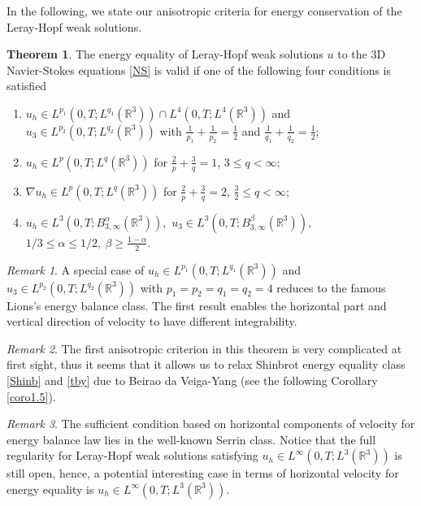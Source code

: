\documentclass[11pt]{article}
\theoremstyle{plain}\newtheorem{definition}{Definition}[section]
\theoremstyle{definition}\newtheorem{theorem}{Theorem}[section]
\theoremstyle{plain}\newtheorem{lemma}[theorem]{Lemma}
\theoremstyle{plain}\newtheorem{coro}[theorem]{Corollary}
\theoremstyle{plain}\newtheorem{prop}[theorem]{Proposition}
\theoremstyle{remark}\newtheorem{remark}{Remark}[section]
\newcommand{\f}{\frac}
\numberwithin{equation}{section}
\begin{document}
In the following, we state our anisotropic criteria for energy conservation of the Leray-Hopf weak solutions.
   \begin{theorem}\label{the1.4}
The energy equality of Leray-Hopf weak solutions $u$ to the 3D Navier-Stokes equations \eqref{NS} is valid if one of the following four conditions is satisfied
 \begin{enumerate}[(1)]
 \item  $u_{h}\in L^{p_{1}}(0,T;L^{q_{1}}(\mathbb{R}^{3}))\cap L^{4}(0,T;L^{4}(\mathbb{R}^{3}))$       and  $u_{3}\in L^{p_{2}}(0,T;L^{q_{2}}(\mathbb{R}^{3}))$  with
$\f{1}{p_{1}}+\f{1}{p_{2}}=\f12$  and  $\f{1}{q_{1}}+\f{1}{q_{2}}=\f12$;
 \item $u_{h}\in L^{p }(0,T;L^{q }(\mathbb{R}^{3}))$ for $\f{2}{p }+\f{3}{q }=1$, $3\leq q < \infty;$
     \item $\nabla u_{h}\in L^{p }(0,T;L^{q }(\mathbb{R}^{3}))$ for $\f{2}{p }+\f{3}{q }=2$, $\f32\leq q <\infty;$
     \item
     $u_{h}\in L^{3}(0,T;B^{\alpha}_{3,\infty}(\mathbb{R}^{3})),$ $u_{3}\in L^{3}(0,T;B^{\beta}_{3,\infty}(\mathbb{R}^{3})),$ $1/3\leq\alpha\leq 1/2,\  \beta\geq \frac{1-\alpha}{2}.$
\end{enumerate}
 \end{theorem}


 \begin{remark}
 A special case of   $u_{h}\in L^{p_{1}}(0,T;L^{q_{1}}(\mathbb{R}^{3}))$       and  $u_{3}\in L^{p_{2}}(0,T;L^{q_{2}}(\mathbb{R}^{3}))$ with  $p_{1}=p_{2}=q_{1}=q_{2}=4$
 reduces to the   famous Lions's
 energy balance class.
 The first result enables the  horizontal part and vertical direction of velocity to have different integrability.
 \end{remark}

 \begin{remark}
The first anisotropic criterion in this theorem is very complicated at first sight, thus it seems that it allows us to  relax Shinbrot energy equality  class \eqref{Shinb} and    \eqref{tby} due to  Beirao da Veiga-Yang (see the following Corollary \ref{coro1.5}).
 \end{remark}

\begin{remark}
The sufficient condition based on
 horizontal   components of velocity for energy balance law lies in the well-known Serrin class. Notice that
the full regularity for Leray-Hopf weak solutions satisfying  $u_h\in L^{\infty}(0, T; L^3(\mathbb{R}^{3}))$ is still open, hence,
 a  potential interesting case in terms of horizontal velocity  for energy equality  is $u_h\in L^{\infty}(0, T; L^3(\mathbb{R}^{3}))$.
\end{remark}
\end{document}
